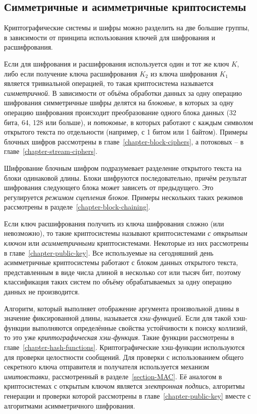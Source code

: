 \subsection{Симметричные и асимметричные криптосистемы}

Криптографические системы и шифры можно разделить на две большие группы, в зависимости от принципа использования ключей для шифрования и расшифрования.

Если для шифрования и расшифрования используется один и тот же ключ $K$, либо если получение ключа расшифрования $K_2$ из ключа шифрования $K_1$ является тривиальной операцией, то такая криптосистема называется \emph{симметричной}. В зависимости от объёма обработки данных за одну операцию шифрования симметричные шифры делятся на \emph{блоковые}, в которых за одну операцию шифрования происходит преобразование одного блока данных (32 бита, 64, 128 или больше), и \emph{потоковые}, в которых работают с каждым символом открытого текста по отдельности (например, с 1 битом или 1 байтом). Примеры блочных шифров рассмотрены в главе~\ref{chapter-block-ciphers}, а потоковых -- в главе~\ref{chapter-stream-ciphers}.

Шифрование блочным шифром подразумевает разделение открытого текста на блоки одинаковой длины. Блоки шифруются последовательно, причём результат шифрования следующего блока может зависеть от предыдущего. Это регулируется \emph{режимом сцепления блоков}. Примеры нескольких таких режимов рассмотрены в разделе~\ref{chapter-block-chaining}.

Если ключ расшифрования получить из ключа шифрования сложно (или невозможно), то такие криптосистемы называют криптосистемами \emph{с открытым ключом} или \emph{асимметричными} криптосистемами. Некоторые из них рассмотрены в главе~\ref{chapter-public-key}. Все используемые на сегодняшний день асимметричные криптосистемы работают с блоком данных открытого текста, представленным в виде числа длиной в несколько сот или тысяч бит, поэтому классификация таких систем по объёму обрабатываемых за одну операцию данных не производится.

Алгоритм, который выполняет отображение аргумента произвольной длины в значение фиксированной длины, называется \emph{хэш-функцией}. Если для такой хэш-функции выполняются определённые свойства устойчивости к поиску коллизий, то это уже \emph{криптографическая хэш-функция}. Такие функции рассмотрены в главе~\ref{chapter-hash-functions}. Криптографические хэш-функции используются для проверки целостности сообщений. Для проверки с использованием общего секретного ключа отправителя и получателя используется механизм \emph{имитовставки}, рассмотренный в разделе~\ref{section-MAC}. Её аналогом в криптосистемах с открытым ключом является \emph{электронная подпись}, алгоритмы генерации и проверки которой рассмотрены в главе~\ref{chapter-public-key} вместе с алгоритмами асимметричного шифрования.
